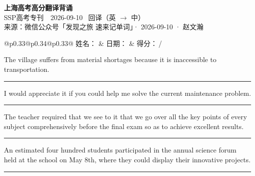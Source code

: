 \documentclass[11pt,a4paper]{article}
\newcommand{\num}[1]{\makebox[1.9em][r]{#1.}\hspace{0.3em}}
\newcommand{\wline}{\noindent\rule{\linewidth}{0.4pt}}
\begin{document}
\pagestyle{plain}
\begin{center}
{\LARGE\bfseries 上海高考高分翻译背诵 }\\[0.25em]
{\large SSP高考专刊　2026-09-10 \quad\ 回译（英 $\to$ 中）}\\[0.35em]
{\footnotesize 来源：微信公众号「发现之旅 速来记单词」· 2026-09-10 · 赵文瀚}
\end{center}

\vspace{0.4em}
\noindent\begin{tabular}{@{}p{0.33\textwidth}@{}p{0.34\textwidth}@{}p{0.33\textwidth}@{}}
姓名：\underline{\hspace{2.0cm}} & 日期：\underline{\hspace{2.0cm}} & 得分：\underline{\hspace{1.4cm}}\,/ \\
\end{tabular}

\vspace{0.5em}

\vspace{0.8em}
\num{1}The village suffers from material shortages because it is inaccessible to transportation.

\vspace{0.25em}

\wline

\num{2}I would appreciate it if you could help me solve the current maintenance problem.

\vspace{0.25em}

\wline

\num{3}The teacher required that we see to it that we go over all the key points of every subject comprehensively before the final exam so as to achieve excellent results.

\vspace{0.25em}

\wline

\num{4}An estimated four hundred students participated in the annual science forum held at the school on May 8th, where they could display their innovative projects.

\vspace{0.25em}

\wline
\end{document}

